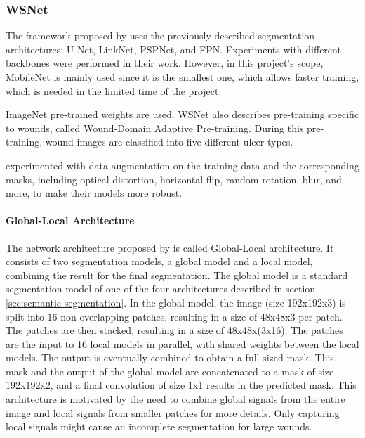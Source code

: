 \subsubsection{WSNet}

The framework proposed by \citeauthor{Oota_2023_WACV} uses the previously described segmentation architectures: U-Net, LinkNet, PSPNet, and FPN. Experiments with different backbones were performed in their work. However, in this project's scope, MobileNet \cite{howard2017mobilenets} is mainly used since it is the smallest one, which allows faster training, which is needed in the limited time of the project.

ImageNet pre-trained weights are used. WSNet also describes pre-training specific to wounds, called Wound-Domain Adaptive Pre-training. During this pre-training, wound images are classified into five different ulcer types.

\citeauthor{Oota_2023_WACV} experimented with data augmentation on the training data and the corresponding masks, including optical distortion, horizontal flip, random rotation, blur, and more, to make their models more robust.

\paragraph{Global-Local Architecture}

The network architecture proposed by \citeauthor{Oota_2023_WACV} is called Global-Local architecture. It consists of two segmentation models, a global model and a local model, combining the result for the final segmentation. The global model is a standard segmentation model of one of the four architectures described in section \ref{sec:semantic-segmentation}. In the global model, the image (size 192x192x3) is split into 16 non-overlapping patches, resulting in a size of 48x48x3 per patch. The patches are then stacked, resulting in a size of 48x48x(3x16). The patches are the input to 16 local models in parallel, with shared weights between the local models. The output is eventually combined to obtain a full-sized mask. This mask and the output of the global model are concatenated to a mask of size 192x192x2, and a final convolution of size 1x1 results in the predicted mask. This architecture is motivated by the need to combine global signals from the entire image and local signals from smaller patches for more details. Only capturing local signals might cause an incomplete segmentation for large wounds. \cite{Oota_2023_WACV} %

